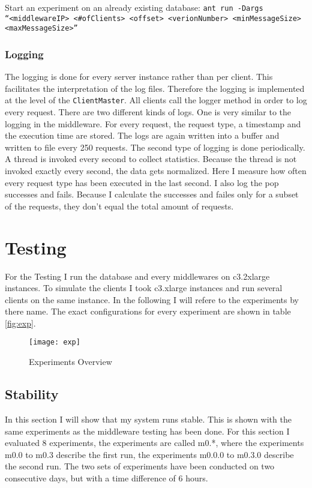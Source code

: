 \documentclass[
10pt, %
a4paper, %
oneside, %
headinclude,footinclude, %
BCOR5mm, %
]{scrartcl}
\begin{document}
Start an experiment on an already existing database:
\texttt{ant run -Dargs ``<middlewareIP> <\#ofClients> <offset> <verionNumber> <minMessageSize> <maxMessageSize>''}


\subsubsection{Logging}
The logging is done for every server instance rather than per client. This facilitates the interpretation of the log files. Therefore the logging is implemented at the level of the \texttt{ClientMaster}. All clients call the logger method in order to log every request. There are two different kinds of logs. One is very similar to the logging in the middleware. For every request, the request type, a timestamp and the execution time are stored. The logs are again written into a buffer and written to file every 250 requests. 
The second type of logging is done periodically. A thread is invoked every second to collect statistics. Because the thread is not invoked exactly every second, the data gets normalized. Here I measure how often every request type has been executed in the last second. I also log the pop successes and fails. Because I calculate the successes and failes only for a subset of the requests, they don't equal the total amount of requests.


\section{Testing}
For the Testing I run the database and every middlewares on c3.2xlarge instances. To simulate the clients I took c3.xlarge instances and run several clients on the same instance. In the following I will refere to the experiments by there name. The exact configurations for every experiment are shown in table \vref{fig:exp}.

\begin{figure}[H]
\begin{adjustwidth}{-2in}{-2in}
\centering
\texttt{[image: exp]}
\caption{Experiments Overview}
\label{fig:exp}
\end{adjustwidth}
\end{figure}


\subsection{Stability}
In this section I will show that my system runs stable. This is shown with the same experiments as the middleware testing has been done. For this section I evaluated 8 experiments, the experiments are called m0.*, where the experiments m0.0 to m0.3 describe the first run, the experiments m0.0.0 to m0.3.0 describe the second run. The two sets of experiments have been conducted on two consecutive days, but with a time difference of 6 hours.
\end{document}
